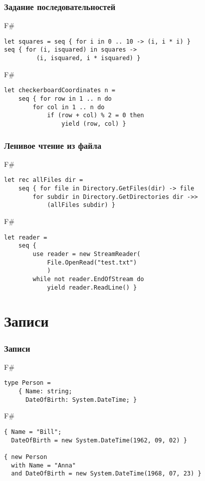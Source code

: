 \documentclass[xetex,mathserif,serif]{beamer}
\begin{document}
	\begin{frame}[fragile]
		\frametitle{Задание последовательностей}
		\begin{exampleblock}{F\#}
			\begin{verbatim}
let squares = seq { for i in 0 .. 10 -> (i, i * i) }
seq { for (i, isquared) in squares -> 
         (i, isquared, i * isquared) }
			\end{verbatim}
		\end{exampleblock}

		\begin{exampleblock}{F\#}
			\begin{verbatim}
let checkerboardCoordinates n =
    seq { for row in 1 .. n do
        for col in 1 .. n do
            if (row + col) % 2 = 0 then
                yield (row, col) }
			\end{verbatim}
		\end{exampleblock}
\end{frame}

	\begin{frame}[fragile]
		\frametitle{Ленивое чтение из файла}
		\begin{exampleblock}{F\#}
			\begin{verbatim}
let rec allFiles dir =
    seq { for file in Directory.GetFiles(dir) -> file
        for subdir in Directory.GetDirectories dir ->> 
            (allFiles subdir) }
			\end{verbatim}
		\end{exampleblock}
		
		\begin{exampleblock}{F\#}
			\begin{verbatim}
let reader =
    seq { 
        use reader = new StreamReader(
            File.OpenRead("test.txt")
            )
        while not reader.EndOfStream do
            yield reader.ReadLine() }
			\end{verbatim}
		\end{exampleblock}
\end{frame}

	\section{Записи}
	
	\begin{frame}[fragile]
		\frametitle{Записи}
		\begin{exampleblock}{F\#}
			\begin{verbatim}
type Person =
    { Name: string;
      DateOfBirth: System.DateTime; }
			\end{verbatim}
		\end{exampleblock}

		\begin{exampleblock}{F\#}
			\begin{verbatim}
{ Name = "Bill"; 
  DateOfBirth = new System.DateTime(1962, 09, 02) }

{ new Person
  with Name = "Anna"
  and DateOfBirth = new System.DateTime(1968, 07, 23) }
			\end{verbatim}
		\end{exampleblock}
\end{frame}
\end{document}
